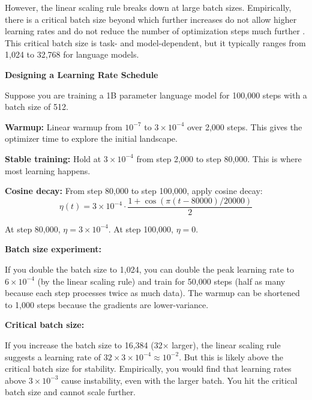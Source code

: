 However, the linear scaling rule breaks down at large batch sizes. Empirically, there is a critical batch size beyond which further increases do not allow higher learning rates and do not reduce the number of optimization steps much further \citep{mccandlish2018batch}. This critical batch size is task- and model-dependent, but it typically ranges from 1,024 to 32,768 for language models.

\vspace{1.5em}

\begin{examplebox}
\textbf{Designing a Learning Rate Schedule}

\vspace{0.5em}

Suppose you are training a 1B parameter language model for 100,000 steps with a batch size of 512.

\vspace{0.5em}

\textbf{Warmup:} Linear warmup from $10^{-7}$ to $3 \times 10^{-4}$ over 2,000 steps. This gives the optimizer time to explore the initial landscape.

\vspace{0.5em}

\textbf{Stable training:} Hold at $3 \times 10^{-4}$ from step 2,000 to step 80,000. This is where most learning happens.

\vspace{0.5em}

\textbf{Cosine decay:} From step 80,000 to step 100,000, apply cosine decay:
\begin{equation}
\eta(t) = 3 \times 10^{-4} \cdot \frac{1 + \cos(\pi (t - 80000) / 20000)}{2}
\end{equation}

At step 80,000, $\eta = 3 \times 10^{-4}$. At step 100,000, $\eta = 0$.

\vspace{0.5em}

\textbf{Batch size experiment:}

If you double the batch size to 1,024, you can double the peak learning rate to $6 \times 10^{-4}$ (by the linear scaling rule) and train for 50,000 steps (half as many because each step processes twice as much data). The warmup can be shortened to 1,000 steps because the gradients are lower-variance.

\vspace{0.5em}

\textbf{Critical batch size:}

If you increase the batch size to 16,384 (32× larger), the linear scaling rule suggests a learning rate of $32 \times 3 \times 10^{-4} \approx 10^{-2}$. But this is likely above the critical batch size for stability. Empirically, you would find that learning rates above $3 \times 10^{-3}$ cause instability, even with the larger batch. You hit the critical batch size and cannot scale further.
\end{examplebox}

